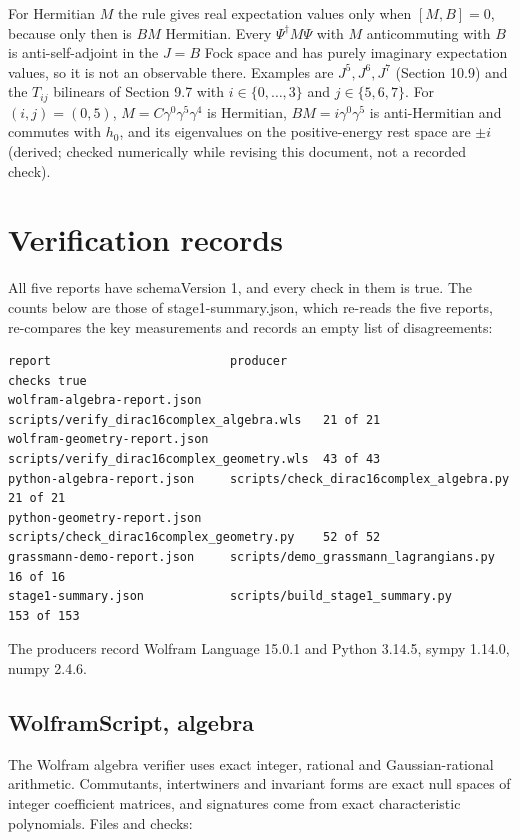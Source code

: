 \documentclass[11pt]{article}
\begin{document}
For Hermitian $M$ the rule gives real expectation values only when $[M,B]=0$, because only then is $BM$ Hermitian. Every $\Psi^\dagger M\Psi$ with $M$ anticommuting with $B$ is anti-self-adjoint in the $J=B$ Fock space and has purely imaginary expectation values, so it is not an observable there. Examples are $J^5,J^6,J^7$ (Section 10.9) and the $T_{ij}$ bilinears of Section 9.7 with $i\in\{0,\dots,3\}$ and $j\in\{5,6,7\}$. For $(i,j)=(0,5)$, $M=C\gamma^0\gamma^5\gamma^4$ is Hermitian, $BM=i\gamma^0\gamma^5$ is anti-Hermitian and commutes with $h_0$, and its eigenvalues on the positive-energy rest space are $\pm i$ (derived; checked numerically while revising this document, not a recorded check).

\section{Verification records}

All five reports have schemaVersion 1, and every check in them is true. The counts below are those of stage1-summary.json, which re-reads the five reports, re-compares the key measurements and records an empty list of disagreements:

\begin{Verbatim}[fontsize=\small]
report                         producer                                    checks true
wolfram-algebra-report.json    scripts/verify_dirac16complex_algebra.wls   21 of 21
wolfram-geometry-report.json   scripts/verify_dirac16complex_geometry.wls  43 of 43
python-algebra-report.json     scripts/check_dirac16complex_algebra.py     21 of 21
python-geometry-report.json    scripts/check_dirac16complex_geometry.py    52 of 52
grassmann-demo-report.json     scripts/demo_grassmann_lagrangians.py       16 of 16
stage1-summary.json            scripts/build_stage1_summary.py             153 of 153
\end{Verbatim}

The producers record Wolfram Language 15.0.1 and Python 3.14.5, sympy 1.14.0, numpy 2.4.6.

\subsection{WolframScript, algebra}

The Wolfram algebra verifier uses exact integer, rational and Gaussian-rational arithmetic. Commutants, intertwiners and invariant forms are exact null spaces of integer coefficient matrices, and signatures come from exact characteristic polynomials. Files and checks:
\end{document}
